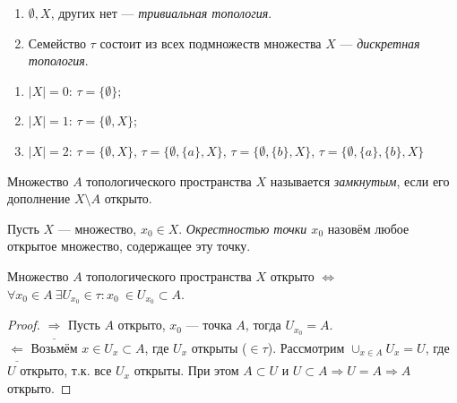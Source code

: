 \begin{example}
    \begin{enumerate}
        $\empty$
        \item $\emptyset, X$, других нет — \textit{тривиальная топология}.
        \item Семейство $\tau$ состоит из всех подмножеств множества $X$ — \textit{дискретная топология}.
    \end{enumerate}
\end{example}

\begin{example} 
    \begin{enumerate}
        $\empty$
        \item $|X| = 0$: $\tau = \{\emptyset\};$
        \item $|X| = 1$: $\tau = \{\emptyset, X\}$;
        \item $|X| = 2$: $\tau = \{\emptyset, X\}$, $\tau = \{\emptyset, \{a\}, X\}$, $\tau = \{\emptyset, \{b\}, X\}$, $\tau = \{\emptyset, \{a\}, \{b\}, X\}$
    \end{enumerate}
\end{example}

\begin{definition}
    Множество $A$ топологического пространства $X$ называется \textit{замкнутым}, если его дополнение $X \setminus A$ открыто.
\end{definition}

\begin{definition}
    Пусть $X$ — множество, $x_0 \in X$. \textit{Окрестностью точки $x_0$} назовём любое открытое множество, содержащее эту точку.
\end{definition}

\begin{statement}
    Множество $A$ топологического пространства $X$ открыто $\Longleftrightarrow$ $\forall x_0 \in A \ \exists U_{x_0} \in \tau: x_0 \ \in U_{x_0} \subset A$.
\end{statement}
\begin{proof}
    $\underline{\Longrightarrow}$ Пусть $A$ открыто, $x_0$ — точка $A$, тогда $U_{x_0} = A$. \\
    $\underline{\Longleftarrow}$ Возьмём $x \in U_x \subset A$, где $U_x$ открыты ($\in \tau$).
    Рассмотрим $\cup_{x \in A} U_x = U$, где $U$ открыто, т.к. все $U_x$ открыты.
    При этом $A \subset U$ и $U \subset A \Longrightarrow U = A \Longrightarrow A$ открыто.
\end{proof}

